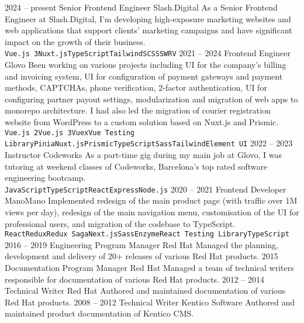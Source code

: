 \documentclass[9pt]{developercv}
\begin{document}

\begin{entrylist}
  \entry
  {2024 --  present}
  {Senior Frontend Engineer}
  {Slash.Digital}
  {As a Senior Frontend Engineer at Slash.Digital, I'm developing high-exposure marketing websites and web applications that support clients' marketing campaigns and have significant impact on the growth of their business.\\ \texttt{Vue.js 3}\slashsep\texttt{Nuxt.js}\slashsep\texttt{TypeScript}\slashsep\texttt{Tailwind}\slashsep\texttt{SCSS}\slashsep\texttt{SWRV}}
  \entry
  {2021 --  2024}
  {Frontend Engineer}
  {Glovo}
  {Been working on various projects including UI for the company's billing and invoicing system, UI for configuration of payment gateways and payment methods, CAPTCHAs, phone verification, 2-factor authentication, UI for configuring partner payout settings, modularization and migration of web apps to monorepo architecture. I had also led the migration of courier registration website from WordPress to a custom solution based on Nuxt.js and Prismic.\\ \texttt{Vue.js 2}\slashsep\texttt{Vue.js 3}\slashsep\texttt{Vuex}\slashsep\texttt{Vue Testing Library}\slashsep\texttt{Pinia}\slashsep\texttt{Nuxt.js}\slashsep\texttt{Prismic}\slashsep\texttt{TypeScript}\slashsep\texttt{Sass}\slashsep\texttt{Tailwind}\slashsep\texttt{Element UI}}
  \entry
  {2022 --  2023}
  {Instructor}
  {Codeworks}
  {As a part-time gig during my main job at Glovo, I was tutoring at weekend classes of Codeworks, Barcelona’s top rated software engineering bootcamp.\\ \texttt{JavaScript}\slashsep\texttt{TypeScript}\slashsep\texttt{React}\slashsep\texttt{Express}\slashsep\texttt{Node.js}}
  \entry
  {2020 -- 2021}
  {Frontend Developer}
  {ManoMano}
  {Implemented redesign of the main product page (with traffic over 1M views per day), redesign of the main navigation menu, customisation of the UI for professional users, and migration of the codebase to TypeScript.\\ \texttt{React}\slashsep\texttt{Redux}\slashsep\texttt{Redux Saga}\slashsep\texttt{Next.js}\slashsep\texttt{Sass}\slashsep\texttt{Enzyme}\slashsep\texttt{React Testing Library}\slashsep\texttt{TypeScript}}
  \entry
  {2016 -- 2019}
  {Engineering Program Manager}
  {Red Hat}
  {Managed the planning, development and delivery of 20+ releases of various Red Hat products. }
  \entry
  {2015}
  {Documentation Program Manager}
  {Red Hat}
  {Managed a team of technical writers responsible for documentation of various Red Hat products. }
  \entry
  {2012 -- 2014}
  {Technical Writer}
  {Red Hat}
  {Authored and maintained documentation of various Red Hat products. }
  \entry
  {2008 -- 2012}
  {Technical Writer}
  {Kentico Software}
  {Authored and maintained product documentation of Kentico CMS. }
\end{entrylist}
\end{document}
